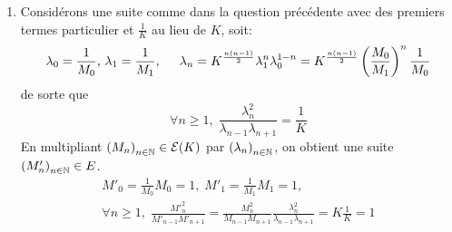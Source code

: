 \begin{enumerate}
\begin{enumerate}
  \item Considérons une suite comme dans la question précédente avec des premiers termes particulier et $\frac{1}{K}$ au lieu de $K$, soit:
\begin{displaymath}
\lambda_0 = \frac{1}{M_0}, \, \lambda_1 = \frac{1}{M_1}, \hspace{0.5cm}
\lambda_n = K^{\frac{n(n-1)}{2}}\lambda_1^{n}\lambda_0^{1-n}
= K^{\frac{n(n-1)}{2}} \left( \frac{M_0}{M_1}\right)^n \frac{1}{M_0} 
\end{displaymath}
de sorte que 
\begin{displaymath}
  \forall n \geq 1,\; \frac{\lambda_n^2}{\lambda_{n-1}\lambda_{n+1}} = \frac{1}{K}
\end{displaymath}
En multipliant $\left( M_n\right)_{n\in \mathbb{N}}\in \mathcal{E}(K)$ par $\left( \lambda_n\right)_{n\in \mathbb{N}}$, on obtient une suite $\left( M'_n\right)_{n\in \mathbb{N}}\in E$.
\begin{multline*}
M'_0= \frac{1}{M_0}M_0 = 1, \; M'_1= \frac{1}{M_1}M_1 = 1,\\
\forall n\geq 1,\;
\frac{{M'}_n^2}{M'_{n-1}M'_{n+1}} = \frac{M_n^2}{M_{n-1}M_{n+1}} \frac{\lambda_n^2}{\lambda_{n-1}\lambda_{n+1}}
=K \frac{1}{K} =1
\end{multline*}
\end{enumerate}

\end{enumerate}
